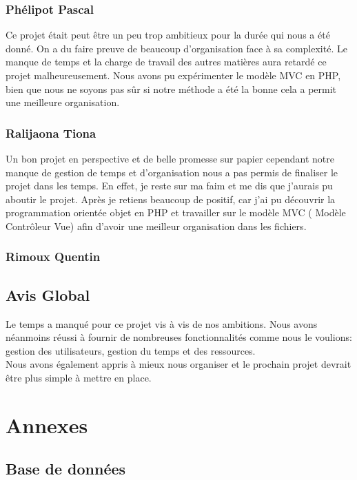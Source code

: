 \documentclass[11pt,a4paper]{article}
\begin{document}
\subsubsection{Phélipot Pascal}
Ce projet était peut être un peu trop ambitieux pour la durée qui nous a été donné. On a du faire preuve de beaucoup d'organisation face à sa complexité. Le manque de temps et la charge de travail des autres matières aura retardé ce projet malheureusement. Nous avons pu expérimenter le modèle MVC en PHP, bien que nous ne soyons pas sûr si notre méthode a été la bonne cela a permit une meilleure organisation.
\subsubsection{Ralijaona Tiona}
Un bon projet en perspective et de belle promesse sur papier cependant notre manque de gestion de temps et d'organisation nous a pas permis de finaliser le projet dans les temps. En effet, je reste sur ma faim et me dis que j'aurais pu aboutir le projet. Après je retiens beaucoup de positif, car j'ai pu découvrir la programmation orientée objet en PHP et travailler sur le modèle MVC ( Modèle Contrôleur Vue) afin d'avoir une meilleur organisation dans les fichiers. 
\subsubsection{Rimoux Quentin}
\subsection{Avis Global}
Le temps a manqué pour ce projet vis à vis de nos ambitions. Nous avons néanmoins réussi à fournir de nombreuses fonctionnalités comme nous le voulions: gestion des utilisateurs, gestion du temps et des ressources.\\
Nous avons également appris à mieux nous organiser et le prochain projet devrait être plus simple à mettre en place.

\newpage{}
\section{Annexes}
\subsection{Base de données}
\end{document}
